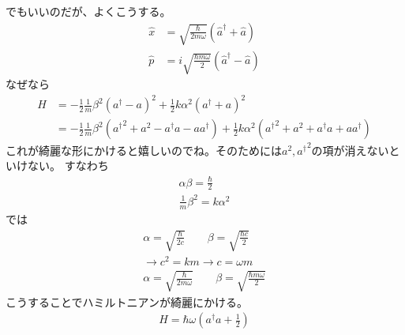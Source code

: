 \documentclass{jsarticle}
\begin{document}
でもいいのだが、よくこうする。
\begin{align*}
  \hat{x}  &= \sqrt{\frac{\hbar}{2m\omega}} \left( \hat{a}^{\dagger}  + \hat{a} \right) \\
  \hat{p}  &= i \sqrt{\frac{\hbar m\omega}{2}} \left( \hat{a}^{\dagger}  - \hat{a} \right)
\end{align*}
なぜなら
\begin{align*}
  H  & = -\frac{1}{2} \frac{1}{m} \beta^2 \left( a^\dagger - a \right)^2 
      + \frac{1}{2} k \alpha^2 \left( a^\dagger + a \right)^2\\
    & = -\frac{1}{2} \frac{1}{m} \beta^2 ( {a^\dagger}^2 + a^2 - a^\dagger a - a a^\dagger)
     + \frac{1}{2} k \alpha^2 ( {a^\dagger}^2 + a^2 + a^\dagger a + a a^\dagger)
\end{align*}
これが綺麗な形にかけると嬉しいのでね。そのためには$a^2,{a^\dagger}^2$の項が消えないといけない。
すなわち
\begin{gather*}
  \alpha \beta = \frac{\hbar}{2} \\ 
  \frac{1}{m} \beta ^2 = k \alpha^2
\end{gather*}
では
\begin{gather*}
  \alpha = \sqrt{\frac{\hbar }{2c}} \qquad \beta = \sqrt{\frac{\hbar c}{2}}\\
  \rightarrow c^2 = km \rightarrow c = \omega m\\
  \alpha = \sqrt{\frac{\hbar}{2 m \omega}} \qquad \beta = \sqrt{\frac{\hbar m \omega}{2}}
\end{gather*}
こうすることでハミルトニアンが綺麗にかける。
\begin{gather*}
  H = \hbar \omega \left(a^\dagger a + \frac{1}{2} \right)
\end{gather*}
\end{document}
